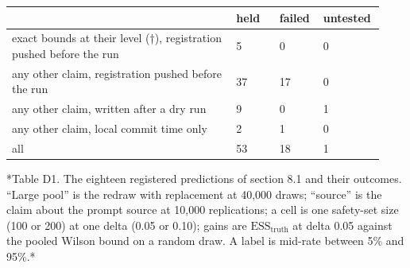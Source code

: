\documentclass[11pt]{article}
\begin{document}
\begingroup\footnotesize\setlength{\tabcolsep}{4pt}
\begin{longtable}{@{}>{\raggedright\arraybackslash}p{0.577\linewidth}>{\raggedright\arraybackslash}p{0.117\linewidth}>{\raggedright\arraybackslash}p{0.117\linewidth}>{\raggedright\arraybackslash}p{0.117\linewidth}@{}}
\toprule
 & \textbf{\hspace{0pt}held} & \textbf{\hspace{0pt}failed} & \textbf{\hspace{0pt}untested} \\
\midrule
\endhead
\bottomrule
\endlastfoot
\hspace{0pt}exact bounds at their level (†), registration pushed before the run & \hspace{0pt}5 & \hspace{0pt}0 & \hspace{0pt}0 \\
\hspace{0pt}any other claim, registration pushed before the run & \hspace{0pt}37 & \hspace{0pt}17 & \hspace{0pt}0 \\
\hspace{0pt}any other claim, written after a dry run & \hspace{0pt}9 & \hspace{0pt}0 & \hspace{0pt}1 \\
\hspace{0pt}any other claim, local commit time only & \hspace{0pt}2 & \hspace{0pt}1 & \hspace{0pt}0 \\
\hspace{0pt}all & \hspace{0pt}53 & \hspace{0pt}18 & \hspace{0pt}1 \\
\end{longtable}
\endgroup

*Table D1. The eighteen registered predictions of section 8.1 and their outcomes. ``Large pool'' is the redraw with replacement at 40,000 draws; ``source'' is the claim about the prompt source at 10,000 replications; a cell is one safety-set size (100 or 200) at one delta (0.05 or 0.10); gains are $\mathrm{ESS}_{\mathrm{truth}}$ at delta 0.05 against the pooled Wilson bound on a random draw. A label is mid-rate between 5\% and 95\%.*
\end{document}
